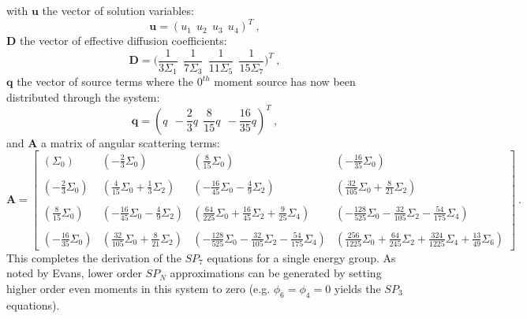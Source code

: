 \documentclass[letterpaper,12pt]{article}
\begin{document}
with $\mathbf{u}$ the vector of solution variables:
\begin{equation}
  \mathbf{u} = ( u_1\ \ u_2\ \ u_3\ \ u_4 )^T \:,
  \label{eq:spn7_solution_vector}
\end{equation}
$\mathbf{D}$ the vector of effective diffusion coefficients:
\begin{equation}
  \mathbf{D} = \Bigg( \frac{1}{3\Sigma_1}\ \ \frac{1}{7\Sigma_3}\ \
  \frac{1}{11\Sigma_5}\ \ \frac{1}{15\Sigma_7} \Bigg)^T\:,
  \label{eq:spn7_diffusion_coeffs}
\end{equation}
$\mathbf{q}$ the vector of source terms where the $0^{th}$ moment
source has now been distributed through the system:
\begin{equation}
  \mathbf{q} = (
  q\ \ -\frac{2}{3}q\ \ \frac{8}{15}q\ \ -\frac{16}{35}q )^T\:,
  \label{eq:spn7_source_vector}
\end{equation}
and $\mathbf{A}$ a matrix of angular scattering terms:
\begin{equation}
  \mathbf{A} = 
  \begin{bmatrix}
    (\Sigma_0) &
    (-\frac{2}{3}\Sigma_0) &
    (\frac{8}{15}\Sigma_0) &
    (-\frac{16}{35}\Sigma_0) \\
    &&&\\
    (-\frac{2}{3}\Sigma_0) &
    (\frac{4}{15}\Sigma_0 + \frac{1}{3}\Sigma_2) &
    (-\frac{16}{45}\Sigma_0 - \frac{4}{9}\Sigma_2) &
    (\frac{32}{105}\Sigma_0 + \frac{8}{21}\Sigma_2) \\
    &&&\\
    (\frac{8}{15}\Sigma_0) &
    (-\frac{16}{45}\Sigma_0 - \frac{4}{9}\Sigma_2) &
    (\frac{64}{225}\Sigma_0 + \frac{16}{45}\Sigma_2 + \frac{9}{25}\Sigma_4) &
    (-\frac{128}{525}\Sigma_0 - \frac{32}{105}\Sigma_2 - \frac{54}{175}\Sigma_4)
    \\ 
    &&&\\
    (-\frac{16}{35}\Sigma_0) &
    (\frac{32}{105}\Sigma_0 + \frac{8}{21}\Sigma_2) &
    (-\frac{128}{525}\Sigma_0 - \frac{32}{105}\Sigma_2 - \frac{54}{175}\Sigma_4)
    & 
    (\frac{256}{1225}\Sigma_0 + \frac{64}{245}\Sigma_2 +
    \frac{324}{1225}\Sigma_4 + \frac{13}{49}\Sigma_6)
  \end{bmatrix}\:.
\end{equation}
This completes the derivation of the $SP_7$ equations for a single
energy group. As noted by Evans, lower order $SP_N$ approximations can
be generated by setting higher order even moments in this system to
zero (e.g. $\phi_6 = \phi_4 = 0$ yields the $SP_3$ equations).
\end{document}
